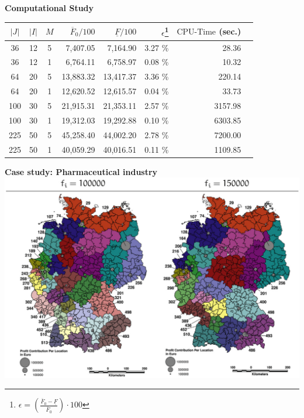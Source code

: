 \begin{frame}{\textbf{Computational Study}}
\begin{center}
    \small
    \begin{tabular}{cccrrrrr}
    \toprule
        $|J|$ & $|I|$ & $M$ & $\overline{F}_0/100$ & $\underline{F}/100$ & $\epsilon$\footnote{$\epsilon=\left(\frac{\overline{F}_0-\underline{F}}{\overline{F}_0} \right) \cdot 100$} &  $\text{CPU-Time}$ (sec.)  \\ \midrule
        36 & 12 & 5 & 7,407.05 & 7,164.90 & 3.27 \%  & 28.36 \\
        36 & 12 & 1 & 6,764.11 & 6,758.97 & 0.08 \%   & 10.32  \\ \midrule
        64 & 20 & 5 & 13,883.32 & 13,417.37 & 3.36 \%  & 220.14  \\
        64 & 20 & 1 & 12,620.52 & 12,615.57 & 0.04 \% & 33.73 \\ \midrule
        100 & 30 & 5 & 21,915.31 & 21,353.11 & 2.57 \%  & 3157.98 \\
        100 & 30 & 1 & 19,312.03 & 19,292.88 & 0.10 \%  & 6303.85 \\ \midrule 
        225 & 50 & 5 & 45,258.40 & 44,002.20 & 2.78 \%  & 7200.00  \\
        225 & 50 & 1 & 40,059.29 & 40,016.51 & 0.11 \%  & 1109.85  \\ \bottomrule
    \end{tabular}
\end{center}
\end{frame}


\begin{frame}{\textbf{Case study: Pharmaceutical industry}}
\centering \includegraphics[width=.75\textwidth]{map1.png}
\end{frame}

